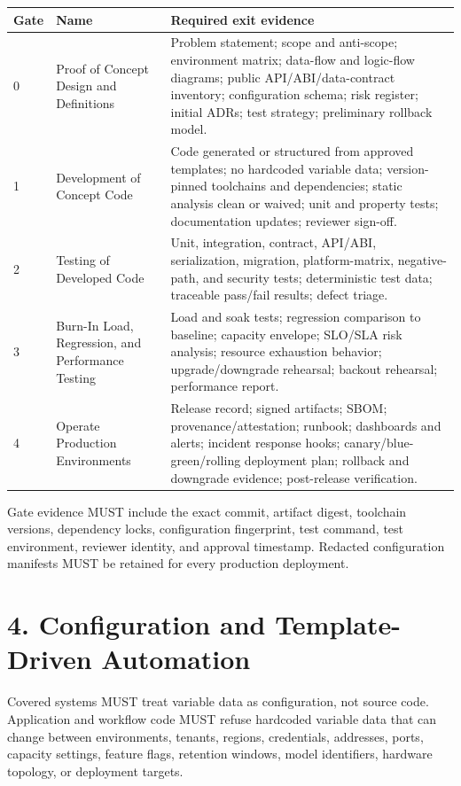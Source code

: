 \documentclass[11pt]{article}
\begin{document}
\begin{longtable}{|p{}|p{}|p{}|}
\hline
Gate & Name & Required exit evidence \\ \hline
0 & Proof of Concept Design and Definitions & Problem statement; scope and anti-scope; environment matrix; data-flow and logic-flow diagrams; public API/ABI/data-contract inventory; configuration schema; risk register; initial ADRs; test strategy; preliminary rollback model. \\ \hline
1 & Development of Concept Code & Code generated or structured from approved templates; no hardcoded variable data; version-pinned toolchains and dependencies; static analysis clean or waived; unit and property tests; documentation updates; reviewer sign-off. \\ \hline
2 & Testing of Developed Code & Unit, integration, contract, API/ABI, serialization, migration, platform-matrix, negative-path, and security tests; deterministic test data; traceable pass/fail results; defect triage. \\ \hline
3 & Burn-In Load, Regression, and Performance Testing & Load and soak tests; regression comparison to baseline; capacity envelope; SLO/SLA risk analysis; resource exhaustion behavior; upgrade/downgrade rehearsal; backout rehearsal; performance report. \\ \hline
4 & Operate Production Environments & Release record; signed artifacts; SBOM; provenance/attestation; runbook; dashboards and alerts; incident response hooks; canary/blue-green/rolling deployment plan; rollback and downgrade evidence; post-release verification. \\ \hline
\end{longtable}
Gate evidence MUST include the exact commit, artifact digest, toolchain versions, dependency locks, configuration fingerprint, test command, test environment, reviewer identity, and approval timestamp. Redacted configuration manifests MUST be retained for every production deployment.


\hypertarget{sec-configuration-automation}{}
\section*{4. Configuration and Template-Driven Automation}
Covered systems MUST treat variable data as configuration, not source code. Application and workflow code MUST refuse hardcoded variable data that can change between environments, tenants, regions, credentials, addresses, ports, capacity settings, feature flags, retention windows, model identifiers, hardware topology, or deployment targets.
\end{document}
